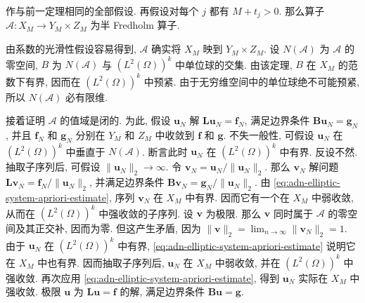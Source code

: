 \begin{Corollary}
\label{cor:adn-boundary-operator-semi-fredholm}
作与前一定理相同的全部假设. 再假设对每个 $j$ 都有 $M+t_j>0$. 那么算子 $\mathcal{A}:X_M\to Y_M\times Z_M$ 为半 Fredholm 算子.
\end{Corollary}

\begin{Proof}
由系数的光滑性假设容易得到, $\mathcal{A}$ 确实将 $X_M$ 映到 $Y_M\times Z_M$. 设 $N(\mathcal{A})$ 为 $\mathcal{A}$ 的零空间, $B$ 为 $N(\mathcal{A})$ 与 $(L^2(\Omega))^k$ 中单位球的交集. 由该定理, $B$ 在 $X_M$ 的范数下有界, 因而在 $(L^2(\Omega))^k$ 中预紧. 由于无穷维空间中的单位球绝不可能预紧, 所以 $N(\mathcal{A})$ 必有限维.

接着证明 $\mathcal{A}$ 的值域是闭的. 为此, 假设 $\bm{u}_N$ 解 $\bm{L}\bm{u}_N=\bm{f}_N$, 满足边界条件 $\bm{B}\bm{u}_N=\bm{g}_N$, 并且 $\bm{f}_N$ 和 $\bm{g}_N$ 分别在 $Y_M$ 和 $Z_M$ 中收敛到 $\bm{f}$ 和 $\bm{g}$. 不失一般性, 可假设 $\bm{u}_N$ 在 $(L^2(\Omega))^k$ 中垂直于 $N(\mathcal{A})$. 断言此时 $\bm{u}_N$ 在 $(L^2(\Omega))^k$ 中有界. 反设不然. 抽取子序列后, 可假设 $\|\bm{u}_N\|_2\to\infty$. 令 $\bm{v}_N=\bm{u}_N/\|\bm{u}_N\|_2$. 那么 $\bm{v}_N$ 解问题 $\bm{L}\bm{v}_N=\bm{f}_N/\|\bm{u}_N\|_2$, 并满足边界条件 $\bm{B}\bm{v}_N=\bm{g}_N/\|\bm{u}_N\|_2$. 由 \eqref{eq:adn-elliptic-system-apriori-estimate}, 序列 $\bm{v}_N$ 在 $X_M$ 中有界. 因而它有一个在 $X_M$ 中弱收敛, 从而在 $(L^2(\Omega))^k$ 中强收敛的子序列. 设 $\bm{v}$ 为极限. 那么 $\bm{v}$ 同时属于 $\mathcal{A}$ 的零空间及其正交补, 因而为零. 但这产生矛盾, 因为 $\|\bm{v}\|_2=\lim_{n\to\infty}\|\bm{v}_N\|_2=1$. 由于 $\bm{u}_N$ 在 $(L^2(\Omega))^k$ 中有界, \eqref{eq:adn-elliptic-system-apriori-estimate} 说明它在 $X_M$ 中也有界. 因而抽取子序列后, $\bm{u}_N$ 在 $X_M$ 中弱收敛, 并在 $(L^2(\Omega))^k$ 中强收敛. 再次应用 \eqref{eq:adn-elliptic-system-apriori-estimate}, 得到 $\bm{u}_N$ 实际在 $X_M$ 中强收敛. 极限 $\bm{u}$ 为 $\bm{L}\bm{u}=\bm{f}$ 的解, 满足边界条件 $\bm{B}\bm{u}=\bm{g}$.
\end{Proof}

